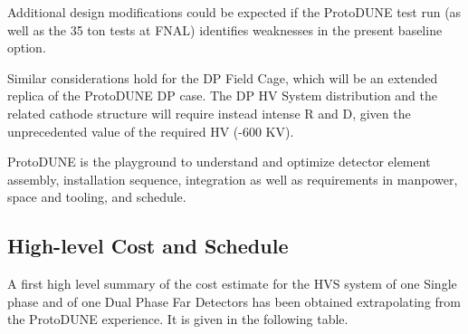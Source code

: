 Additional design modifications could be expected if the ProtoDUNE test run (as well as the 35 ton tests at FNAL) identifies weaknesses in the present baseline option.

Similar considerations hold for the DP Field Cage, which will be an extended replica of the ProtoDUNE DP case. The DP HV System distribution and the related cathode structure will require instead intense R and D, given the unprecedented value of the required HV (-600 KV). 

ProtoDUNE is the playground to understand and optimize detector element assembly, installation sequence, integration as well as requirements in manpower, space and tooling, and schedule. 



%
%
%
\subsection{High-level Cost and Schedule}
\label{sec:fddp-hv-org-cs}

A first high level summary of the cost estimate for the HVS system of one Single phase and of one Dual Phase Far Detectors has been obtained extrapolating from the ProtoDUNE experience. It is given in the  following table.















